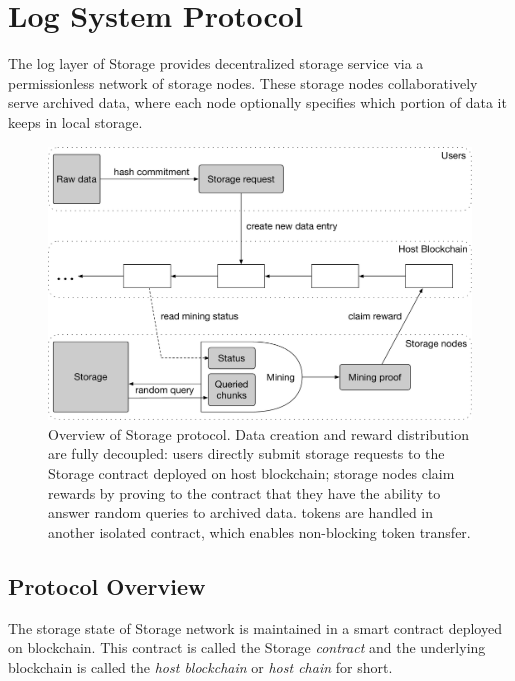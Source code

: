 \section{Log System Protocol}


The log layer of \projabbrev Storage provides decentralized storage service via a permissionless network of storage nodes.
These storage nodes collaboratively serve archived data,
where each node optionally specifies which portion of data it keeps in local storage.

\begin{figure}[H]
		\includegraphics[width=\textwidth]{figure/protocol_overview.pdf}
		\caption{Overview of \projabbrev Storage protocol. Data creation and reward distribution are fully decoupled: users directly submit storage requests to the \projabbrev Storage contract deployed on host blockchain; storage nodes claim rewards by proving to the contract that they have the ability to answer random queries to archived data. \projabbrev tokens are handled in another isolated contract, which enables non-blocking token transfer.}
		\label{fig:overview}
\end{figure}

\subsection{Protocol Overview}


The storage state of \projabbrev Storage network is maintained in a smart contract deployed on \projabbrev blockchain.
This contract is called the \projabbrev Storage \emph{contract} and the underlying blockchain is called the \emph{host blockchain} or \emph{host chain} for short.

